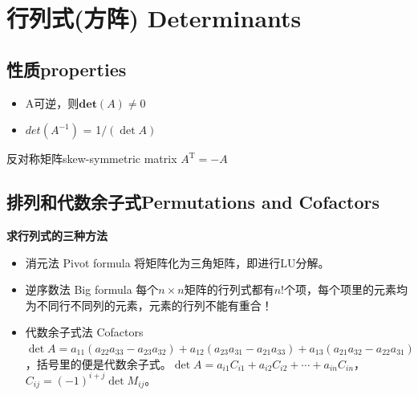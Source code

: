 \documentclass[UTF8]{article}
\begin{document}
    \section{行列式(方阵) Determinants}
    \subsection{性质properties}
    \begin{itemize}
        \item A可逆，则$\bm{det}(A) \neq 0$
        \item $det(A^{-1})$ = 1$/(\operatorname{det} A)$
    \end{itemize}
    反对称矩阵skew-symmetric matrix $A^{\mathrm{T}}=-A$
    \subsection{排列和代数余子式Permutations and Cofactors}
    \textbf{求行列式的三种方法}
    \begin{itemize}
        \item 消元法 Pivot formula 将矩阵化为三角矩阵，即进行LU分解。
        \item 逆序数法 Big formula 每个$n\times n$矩阵的行列式都有$n!$个项，每个项里的元素均为不同行不同列的元素，元素的行列不能有重合！
        \item 代数余子式法 Cofactors $\operatorname{det} A=a_{11}\left(a_{22} a_{33}-a_{23} a_{32}\right)+a_{12}\left(a_{23} a_{31}-a_{21} a_{33}\right)+a_{13}\left(a_{21} a_{32}-a_{22} a_{31}\right)$，括号里的便是代数余子式。$\operatorname{det} A=a_{i 1} C_{i 1}+a_{i 2} C_{i 2}+\cdots+a_{i n} C_{i n}$，$C_{i j}=(-1)^{i+j} \operatorname{det} M_{i j}$。
    \end{itemize}
\end{document}
